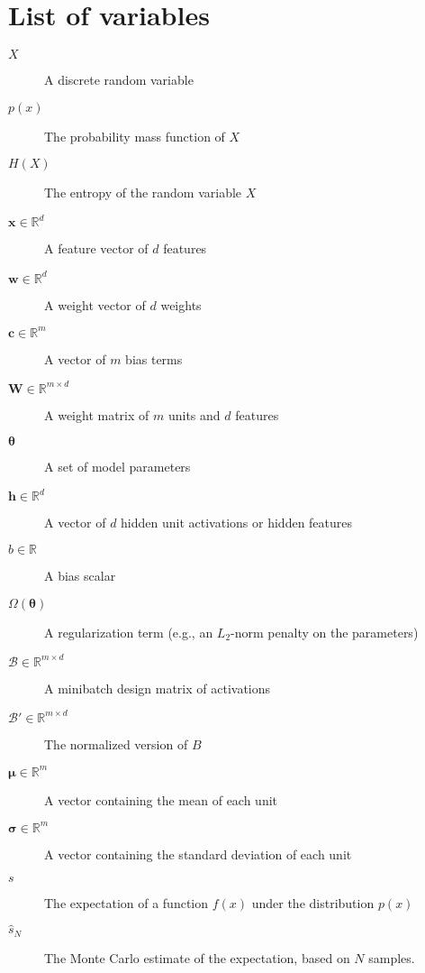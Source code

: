 \chapter*{List of variables}

\begin{description}
    \item[$X$] A discrete random variable
    \item[$p(x)$] The probability mass function of $X$
    \item[$H(X)$] The entropy of the random variable $X$
    \item[$\mathbf{x} \in \mathbb{R}^d$] A feature vector of $d$ features
    \item[$\mathbf{w} \in \mathbb{R}^d$] A weight vector of $d$ weights
    \item[$\mathbf{c} \in \mathbb{R}^m$] A vector of $m$ bias terms
    \item[$\mathbf{W} \in \mathbb{R}^{m\times d}$] A weight matrix of $m$ units and $d$ features
    \item[$\boldsymbol{\theta}$] A set of model parameters
    \item[$\mathbf{h} \in \mathbb{R}^d$] A vector of $d$ hidden unit activations or hidden features
    \item[$b \in \mathbb{R}$] A bias scalar 
    \item[$\Omega(\boldsymbol{\theta})$] A regularization term (e.g., an $L_2$-norm penalty on the parameters)
    \item[$\mathcal{B} \in \mathbb{R}^{m\times d}$] A minibatch design matrix of activations
    \item[$\mathcal{B}' \in \mathbb{R}^{m\times d}$] The normalized version of $B$
    \item[$\boldsymbol{\mu} \in \mathbb{R}^m$] A vector containing the mean of each unit
    \item[$\boldsymbol{\sigma} \in \mathbb{R}^m$] A vector containing the standard deviation of each unit
    
    \item[$s$] The expectation of a function $f(x)$ under the distribution $p(x)$
    \item[$\hat{s}_N$] The Monte Carlo estimate of the expectation, based on $N$ samples.
  \end{description}